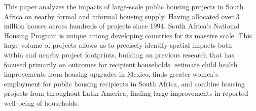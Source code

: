 \documentclass[12pt]{article}
\begin{document}

This paper analyzes the impacts of large-scale public housing projects in South Africa on nearby formal and informal housing supply.  Having allocated over 3 million houses across hundreds of projects since 1994, South Africa's National Housing Program is unique among developing countries for its massive scale.  This large volume of projects allows us to precisely identify spatial impacts both within and nearby project footprints, building on previous research that has focused primarily on outcomes for recipient households.  \cite{cattaneo2009housing} estimate child health improvements from housing upgrades in Mexico, \cite{franklin2016enabled} finds greater women's employment for public housing recipients in South Africa, and \cite{galiani2017shelter} combine housing projects from throughout Latin America, finding large improvements in reported well-being of households.

\end{document}
